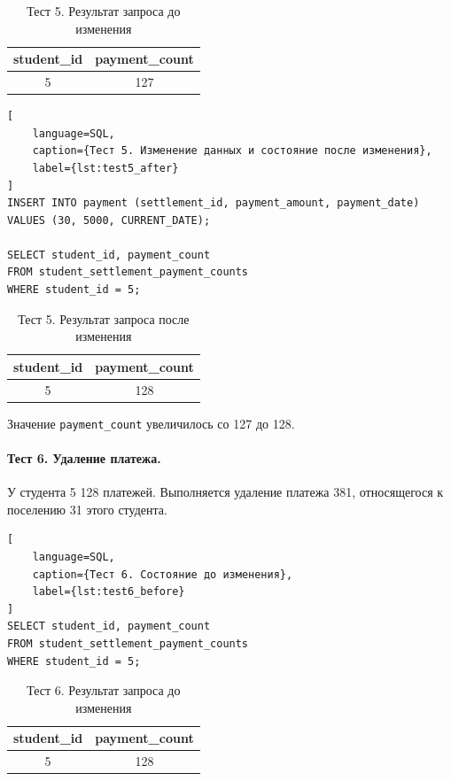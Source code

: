 \begin{table}[H]
\centering
\caption{Тест 5. Результат запроса до изменения}
\label{tab:test5_before}
\small
\begin{tabular}{|c|c|}
\hline
\textbf{student\_id} & \textbf{payment\_count} \\ \hline
5 & 127 \\ \hline
\end{tabular}
\end{table}

\begin{lstlisting}[
    language=SQL,
    caption={Тест 5. Изменение данных и состояние после изменения},
    label={lst:test5_after}
]
INSERT INTO payment (settlement_id, payment_amount, payment_date)
VALUES (30, 5000, CURRENT_DATE);

SELECT student_id, payment_count
FROM student_settlement_payment_counts
WHERE student_id = 5;
\end{lstlisting}

\begin{table}[H]
\centering
\caption{Тест 5. Результат запроса после изменения}
\label{tab:test5_after}
\small
\begin{tabular}{|c|c|}
\hline
\textbf{student\_id} & \textbf{payment\_count} \\ \hline
5 & 128 \\ \hline
\end{tabular}
\end{table}

Значение \texttt{payment\_count} увеличилось со 127 до 128.

\paragraph{Тест 6. Удаление платежа.}
У студента 5 128 платежей. Выполняется удаление платежа 381, относящегося к поселению 31 этого студента.

\begin{lstlisting}[
    language=SQL,
    caption={Тест 6. Состояние до изменения},
    label={lst:test6_before}
]
SELECT student_id, payment_count
FROM student_settlement_payment_counts
WHERE student_id = 5;
\end{lstlisting}

\begin{table}[H]
\centering
\caption{Тест 6. Результат запроса до изменения}
\label{tab:test6_before}
\small
\begin{tabular}{|c|c|}
\hline
\textbf{student\_id} & \textbf{payment\_count} \\ \hline
5 & 128 \\ \hline
\end{tabular}
\end{table}

